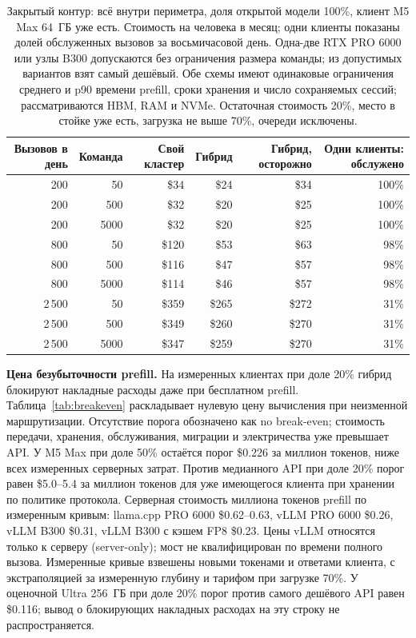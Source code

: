 \begin{table}[t]
\centering
\caption{Закрытый контур: всё внутри периметра, доля открытой модели 100\%, клиент M5 Max 64~ГБ уже есть.
Стоимость на человека в месяц; одни клиенты показаны долей обслуженных вызовов за восьмичасовой день.
Одна-две RTX PRO 6000 или узлы B300 допускаются без ограничения размера команды;
из допустимых вариантов взят самый дешёвый. Обе схемы имеют одинаковые ограничения среднего и p90 времени prefill,
сроки хранения и число сохраняемых сессий; рассматриваются HBM, RAM и NVMe.
Остаточная стоимость 20\%, место в стойке уже есть, загрузка не выше 70\%, очереди исключены.}
\label{tab:perimeter}
\footnotesize
\begin{tabular}{rrrrrr}
\toprule
Вызовов в день & Команда & Свой кластер & Гибрид & Гибрид, осторожно & Одни клиенты: обслужено \\
\midrule
200 & 50 & \$34 & \$24 & \$34 & 100\% \\
200 & 500 & \$32 & \$20 & \$25 & 100\% \\
200 & 5000 & \$32 & \$20 & \$25 & 100\% \\
800 & 50 & \$120 & \$53 & \$63 & 98\% \\
800 & 500 & \$116 & \$47 & \$57 & 98\% \\
800 & 5000 & \$114 & \$46 & \$57 & 98\% \\
2\,500 & 50 & \$359 & \$265 & \$272 & 31\% \\
2\,500 & 500 & \$349 & \$260 & \$270 & 31\% \\
2\,500 & 5000 & \$347 & \$259 & \$270 & 31\% \\
\bottomrule
\end{tabular}
\end{table}

\textbf{Цена безубыточности prefill.} На измеренных клиентах при доле 20\% гибрид блокируют накладные расходы даже при бесплатном prefill.
Таблица~\ref{tab:breakeven} раскладывает нулевую цену вычисления при неизменной маршрутизации.
Отсутствие порога обозначено как no break-even; стоимость передачи, хранения, обслуживания, миграции и электричества уже превышает API.
У M5 Max при доле 50\% остаётся порог \$0.226 за миллион токенов, ниже всех измеренных серверных затрат.
Против медианного API при доле 20\% порог равен \$5.0--5.4 за миллион токенов для уже имеющегося клиента при хранении по политике протокола.
Серверная стоимость миллиона токенов prefill по измеренным кривым: llama.cpp PRO 6000 \$0.62--0.63, vLLM PRO 6000 \$0.26, vLLM B300 \$0.31, vLLM B300 с кэшем FP8 \$0.23.
Цены vLLM относятся только к серверу (server-only); мост не квалифицирован по времени полного вызова.
Измеренные кривые взвешены новыми токенами и ответами клиента, с экстраполяцией за измеренную глубину и тарифом при загрузке 70\%.
У оценочной Ultra 256~ГБ при доле 20\% порог против самого дешёвого API равен \$0.116; вывод о блокирующих накладных расходах на эту строку не распространяется.

